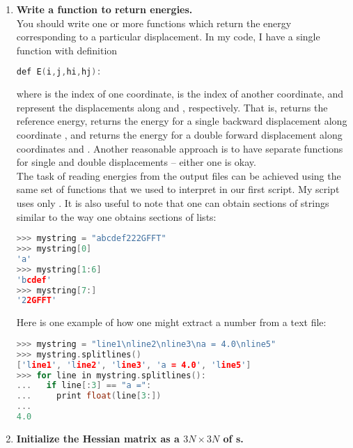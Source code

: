 \documentclass[11pt]{article}
\begin{document}
\begin{enumerate}[label=\textbf{\arabic*}]
\item {\bf Write a function to return energies.}\\
You should write one or more functions which return the energy corresponding to
a particular displacement. In my code, I have a single function with definition
\begin{addmargin}{2cm}{}
\begin{lstlisting}[language=c++]
def E(i,j,hi,hj):
\end{lstlisting}
\end{addmargin}
where  is the index of one coordinate,  is the index of another
coordinate, and  represent the displacements along  and
, respectively. That is,  returns the reference energy,
 returns the energy for a single backward displacement along
coordinate , and  returns the energy for a double
forward displacement along coordinates  and . Another reasonable
approach is to have separate functions for single and double displacements --
either one is okay.\\ The task of reading energies from the output files can be
achieved using the same set of functions that we used to interpret
 in our first script. My script uses only .
It is also useful to note that one can obtain sections of strings similar to
the way one obtains sections of lists:
\begin{addmargin}{2cm}{}
\begin{lstlisting}[language=c++]
>>> mystring = "abcdef222GFFT"
>>> mystring[0]
'a'
>>> mystring[1:6]
'bcdef'
>>> mystring[7:]
'22GFFT'
\end{lstlisting}
\end{addmargin}
Here is one example of how one might extract a number from a text file:
\begin{addmargin}{2cm}{}
\begin{lstlisting}[language=c++]
>>> mystring = "line1\nline2\nline3\na = 4.0\nline5"
>>> mystring.splitlines()
['line1', 'line2', 'line3', 'a = 4.0', 'line5']
>>> for line in mystring.splitlines():
...   if line[:3] == "a =":
...     print float(line[3:])
... 
4.0
\end{lstlisting}
\end{addmargin}
\item {\bf Initialize the Hessian matrix as a $3N\times3N$  of s.}\\

\end{enumerate}
\end{document}
